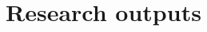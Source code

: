 \documentclass[11pt, a4paper, oneside]{book}
\begin{document}





\label{ch:baseline_model}


























\chapter{Research outputs}
\end{document}

